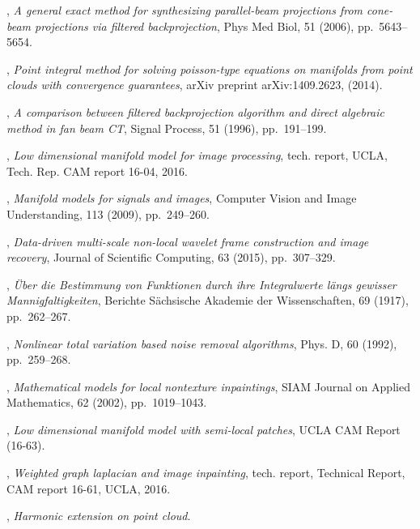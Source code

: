\documentclass[letterpaper,10pt]{article}
\begin{document}
\begin{thebibliography}{10}
, {\em A general
  exact method for synthesizing parallel-beam projections from cone-beam
  projections via filtered backprojection}, Phys Med Biol, 51 (2006),
  pp.~5643--5654.

, {\em Point integral method for solving
  poisson-type equations on manifolds from point clouds with convergence
  guarantees}, arXiv preprint arXiv:1409.2623,  (2014).

, {\em A comparison between
  filtered backprojection algorithm and direct algebraic method in fan beam
  {CT}}, Signal Process, 51 (1996), pp.~191--199.

, {\em Low dimensional manifold model for
  image processing}, tech. report, UCLA, Tech. Rep. CAM report 16-04, 2016.

, {\em Manifold models for signals and images}, Computer
  Vision and Image Understanding, 113 (2009), pp.~249--260.

, {\em Data-driven multi-scale non-local
  wavelet frame construction and image recovery}, Journal of Scientific
  Computing, 63 (2015), pp.~307--329.

, {\em {{\"{U}}ber die Bestimmung von Funktionen durch ihre
  Integralwerte l{\"{a}}ngs gewisser Mannigfaltigkeiten}}, Berichte
  S{\"{a}}chsische Akademie der Wissenschaften, 69 (1917), pp.~262--267.

, {\em {Nonlinear total variation based
  noise removal algorithms}}, Phys. D, 60 (1992), pp.~259--268.

, {\em Mathematical models for local nontexture
  inpaintings}, SIAM Journal on Applied Mathematics, 62 (2002), pp.~1019--1043.

, {\em Low dimensional manifold model with
  semi-local patches}, UCLA CAM Report (16-63).

, {\em Weighted graph laplacian and image
  inpainting}, tech. report, Technical Report, CAM report 16-61, UCLA, 2016.

, {\em Harmonic extension on point cloud}.


\end{thebibliography}
\end{document}
